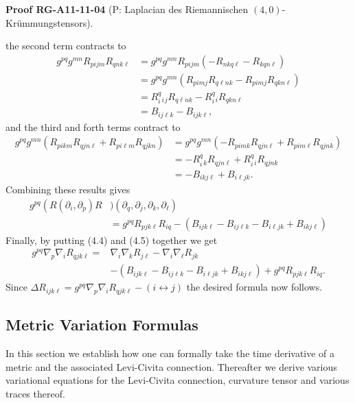 \documentclass[10pt, letterpaper]{article}
\newcommand{\CustomHeading}[3]{%
  \par\medskip\noindent%
  \textbf{#1 #2} \textnormal{(#3)}.\enskip%
}
\newenvironment{PROOF}[2]{\begin{unitbox}\CustomHeading{Proof}{#1}{#2}}{\end{unitbox}}
\begin{document}
\begin{PROOF}{RG-A11-11-04}{P: Laplacian des Riemannischen $(4,0)$-Krümmungstensors}
$$$$
the second term contracts to
$$
\begin{aligned}
g^{p q} g^{m n} R_{p i j m} R_{q n k \ell} & =g^{p q} g^{m n} R_{p i j m}\left(-R_{n k q \ell}-R_{k q n \ell}\right) \\
& =g^{p q} g^{m n}\left(R_{p i m j} R_{q \ell n k}-R_{p i m j} R_{q k n \ell}\right) \\
& =R_{i}^{q}{ }_{i}{ }_{j} R_{q \ell n k}-R_{i}^{q}{ }_{i} R_{q k n \ell} \\
& =B_{i j \ell k}-B_{i j k \ell},
\end{aligned}
$$
and the third and forth terms contract to
$$
\begin{aligned}
g^{p q} g^{m n}\left(R_{p i k m} R_{q j n \ell}+R_{p i \ell m} R_{q j k n}\right) & =g^{p q} g^{m n}\left(-R_{p i m k} R_{q j n \ell}+R_{p i m \ell} R_{q j n k}\right) \\
& =-R_{i}^{q}{ }_{k} R_{q j n \ell}+R_{i}^{q}{ }_{i} R_{q j n k} \\
& =-B_{i k j \ell}+B_{i \ell j k} .
\end{aligned}
$$
Combining these results gives
$$
\begin{aligned}
g^{p q}\left(R\left(\partial_{i}, \partial_{p}\right) R\right. & )\left(\partial_{q}, \partial_{j}, \partial_{k}, \partial_{\ell}\right) \\
& =g^{p q} R_{p j k \ell} R_{i q}-\left(B_{i j k \ell}-B_{i j \ell k}-B_{i \ell j k}+B_{i k j \ell}\right)
\end{aligned}
$$
Finally, by putting (4.4) and (4.5) together we get
$$
\begin{aligned}
g^{p q} \nabla_{p} \nabla_{i} R_{q j k \ell}= & \nabla_{i} \nabla_{k} R_{j \ell}-\nabla_{i} \nabla_{\ell} R_{j k} \\
& -\left(B_{i j k \ell}-B_{i j \ell k}-B_{i \ell j k}+B_{i k j \ell}\right)+g^{p q} R_{p j k \ell} R_{i q} .
\end{aligned}
$$
Since $\Delta R_{i j k \ell}=g^{p q} \nabla_{p} \nabla_{i} R_{q j k \ell}-(i \leftrightarrow j)$ the desired formula now follows.
\end{PROOF}



\pagebreak


\subsection*{Metric Variation Formulas}


In this section we establish how one can formally take the time derivative of a metric and the associated Levi-Civita connection. Thereafter we derive various variational equations for the Levi-Civita connection, curvature tensor and various traces thereof.
\end{document}
